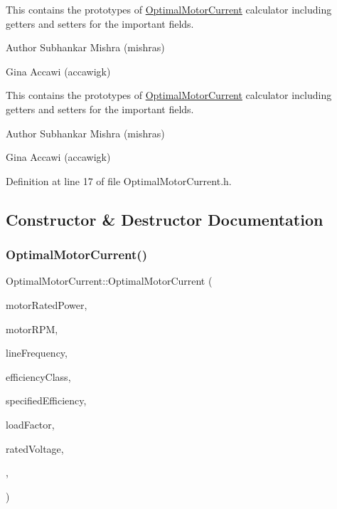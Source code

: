 This contains the prototypes of \hyperlink{class_optimal_motor_current}{Optimal\+Motor\+Current} calculator including getters and setters for the important fields.

\begin{DoxyAuthor}{Author}
Subhankar Mishra (mishras) 

Gina Accawi (accawigk) 
\end{DoxyAuthor}


This contains the prototypes of \hyperlink{class_optimal_motor_current}{Optimal\+Motor\+Current} calculator including getters and setters for the important fields.

\begin{DoxyAuthor}{Author}
Subhankar Mishra (mishras) 

Gina Accawi (accawigk) 
\end{DoxyAuthor}


Definition at line 17 of file Optimal\+Motor\+Current.\+h.



\subsection{Constructor \& Destructor Documentation}
\mbox{\label{class_optimal_motor_current_a6e88ae5d7005b9790810de4f8892ba15}} 
\subsubsection{\texorpdfstring{Optimal\+Motor\+Current()}{OptimalMotorCurrent()}\hspace{0.1cm}{\footnotesize\ttfamily [1/3]}}
{\footnotesize\ttfamily Optimal\+Motor\+Current\+::\+Optimal\+Motor\+Current (\begin{DoxyParamCaption}\item[{double}]{motor\+Rated\+Power,  }\item[{int}]{motor\+R\+PM,  }\item[{\hyperlink{class_motor_acee1bdf1b684ad36cb80dc2829d9fcee}{Motor\+::\+Line\+Frequency}}]{line\+Frequency,  }\item[{\hyperlink{class_motor_afa022971ae062406a9f588c601673d4e}{Motor\+::\+Efficiency\+Class}}]{efficiency\+Class,  }\item[{double}]{specified\+Efficiency,  }\item[{double}]{load\+Factor,  }\item[{double}]{rated\+Voltage,  }\item[{double}]{,  }\item[{double}]{ }\end{DoxyParamCaption})\hspace{0.3cm}{\ttfamily [inline]}}

